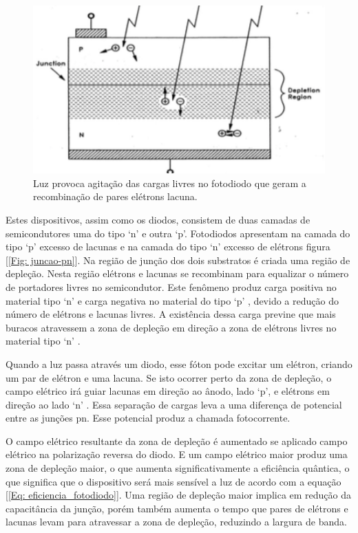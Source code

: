  \begin{figure}
	\centering
		\includegraphics[width = 12cm]{figuras/fotodiodo}
	\caption{Luz provoca agitação das cargas livres no fotodiodo que geram a recombinação de pares elétrons lacuna.}
	\label{Fig: fotodiodo}
\end{figure}

Estes dispositivos, assim como os diodos, consistem de duas camadas de semicondutores uma do tipo \lq n\rq \: e outra \lq p\rq \:. Fotodiodos apresentam na camada do tipo \lq p\rq \: excesso de lacunas e na camada do tipo \lq n\rq \: excesso de elétrons figura [\ref{Fig: juncao-pn}]. Na região de junção dos dois substratos é criada uma região de depleção. Nesta região elétrons e lacunas se recombinam para equalizar o número de portadores livres no semicondutor. Este fenômeno produz carga positiva no material tipo \lq n\rq \: e carga negativa no material do tipo \lq p\rq \: , devido a redução do número de elétrons e lacunas livres. 
A existência dessa carga previne que mais buracos atravessem a zona de depleção em direção a zona de elétrons livres no material tipo \lq n\rq \: . \cite{alexanderstephenb.1997}


Quando a luz passa através um diodo, esse fóton pode excitar um elétron, criando um par de elétron e uma lacuna. Se isto ocorrer perto da zona de depleção, o campo elétrico irá guiar lacunas em direção ao ânodo, lado \lq p\rq \:, e elétrons em direção ao lado \lq n\rq \: . Essa separação de cargas leva a uma diferença de potencial entre as junções pn. Esse potencial produz a chamada fotocorrente.\cite{scherzpaul2007}

O campo elétrico resultante da zona de depleção é aumentado se aplicado campo elétrico na polarização reversa do diodo. E um campo elétrico maior produz uma zona de depleção maior, o que 
aumenta significativamente a eficiência quântica, o que significa que o dispositivo será mais sensível a 
luz de acordo com a equação [\ref{Eq: eficiencia_fotodiodo}]. Uma região de depleção maior implica em redução da capacitância da junção, porém também aumenta o tempo que pares de elétrons e lacunas levam para atravessar a zona de depleção, reduzindo a largura de banda. \cite{alexanderstephenb1997}

